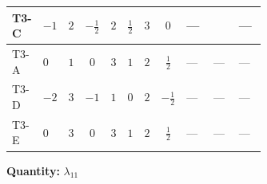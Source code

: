 \documentclass[8pt]{article}
\begin{document}
\begin{landscape}
\begin{longtable}{@{}llcccccc >{\raggedright\arraybackslash}p{0.21\linewidth} >{\raggedright\arraybackslash}p{0.21\linewidth} >{\raggedright\arraybackslash}p{0.21\linewidth}@{}}
\midrule
T3-C & $-1$ & $2$ & $-\frac{1}{2}$ & $2$ & $\frac{1}{2}$ & $3$ & $0$ & --- & \scriptsize\adjustbox{max width=\linewidth}{$\begin{gathered} +{\lambda_{12}^{(A)}} \left(\frac{1}{8} \operatorname{Tr}\!\left({y_2}\,\left({y_1}\right)^{\dagger}\right)+\frac{{\lambda_{10}}}{6}+\frac{5 {\lambda_{11}}}{6}\right)\end{gathered}$} & --- \\
\midrule
T3-A & $0$ & $1$ & $0$ & $3$ & $1$ & $2$ & $\frac{1}{2}$ & --- & --- & --- \\
\midrule
T3-D & $-2$ & $3$ & $-1$ & $1$ & $0$ & $2$ & $-\frac{1}{2}$ & --- & --- & --- \\
\midrule
T3-E & $0$ & $3$ & $0$ & $3$ & $1$ & $2$ & $\frac{1}{2}$ & --- & --- & --- \\
\midrule
\bottomrule
\end{longtable}
\clearpage
\noindent\textbf{Quantity: }$\lambda_{11}$\par\smallskip

\end{landscape}
\end{document}
